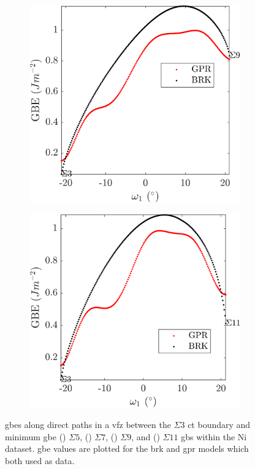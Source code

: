 \documentclass[final,twocolumn,12pt]{elsarticle}
\begin{document}
\begin{figure}[!htb]
		\begin{subfigure}[b]{0.48\textwidth}
			\includegraphics[width=\textwidth]{figures/tunnel-3-9.png}
			\caption{}
			\label{fig:tunnel-3-9}
		\end{subfigure}
		\hfill
		\begin{subfigure}[b]{0.48\textwidth}
			\includegraphics[width=\textwidth]{figures/tunnel-3-11.png}
			\caption{}
			\label{fig:tunnel-3-11}
		\end{subfigure}
		\caption{\Glspl{gbe} along direct paths in a \gls{vfz} between the $\Sigma3$ \gls{ct} boundary and minimum \gls{gbe} () $\Sigma5$, () $\Sigma7$, () $\Sigma9$, and () $\Sigma11$ \glspl{gb} within the Ni \citet{olmstedSurveyComputedGrain2009} dataset. \Gls{gbe} values are plotted for the \gls{brk} and \gls{gpr} models which both used \citet{olmstedSurveyComputedGrain2009} as \inpt{} data. }
		\label{fig:sigma-paths}
	\end{figure}
	
\end{document}

